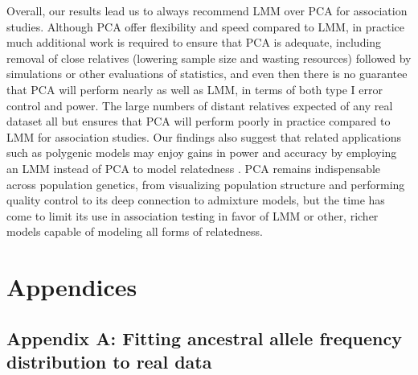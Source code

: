 \documentclass[11pt]{article}
\begin{document}
Overall, our results lead us to always recommend LMM over PCA for association studies.
Although PCA offer flexibility and speed compared to LMM, in practice much additional work is required to ensure that PCA is adequate, including removal of close relatives (lowering sample size and wasting resources) followed by simulations or other evaluations of statistics, and even then there is no guarantee that PCA will perform nearly as well as LMM, in terms of both type I error control and power.
The large numbers of distant relatives expected of any real dataset all but ensures that PCA will perform poorly in practice compared to LMM for association studies.
Our findings also suggest that related applications such as polygenic models may enjoy gains in power and accuracy by employing an LMM instead of PCA to model relatedness \citep{rakitsch_lasso_2013,qian_fast_2020}.
PCA remains indispensable across population genetics, from visualizing population structure and performing quality control to its deep connection to admixture models, but the time has come to limit its use in association testing in favor of LMM or other, richer models capable of modeling all forms of relatedness.

\section{Appendices}

\subsection{Appendix A: Fitting ancestral allele frequency distribution to real data}
\end{document}
